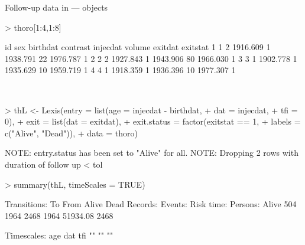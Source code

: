 \begin{frame}{Follow-up data in  ---  objects}
\begin{Schunk}
\begin{Sinput}
> thoro[1:4,1:8]
\end{Sinput}
\begin{Soutput}
  id sex birthdat contrast injecdat volume  exitdat exitstat
1  1   2 1916.609        1 1938.791     22 1976.787        1
2  2   2 1927.843        1 1943.906     80 1966.030        1
3  3   1 1902.778        1 1935.629     10 1959.719        1
4  4   1 1918.359        1 1936.396     10 1977.307        1
\end{Soutput}
\end{Schunk}
\ \\[-1em]
\begin{Schunk}
\begin{Sinput}
> thL <- Lexis(entry = list(age = injecdat - birthdat,
+                           dat = injecdat,
+                           tfi = 0),
+               exit = list(dat = exitdat),
+        exit.status = factor(exitstat == 1,
+                             labels = c("Alive", "Dead")),
+               data = thoro)
\end{Sinput}
\begin{Soutput}
NOTE: entry.status has been set to "Alive" for all.
NOTE: Dropping  2  rows with duration of follow up < tol
\end{Soutput}
\begin{Sinput}
> summary(thL, timeScales = TRUE)
\end{Sinput}
\begin{Soutput}
Transitions:
     To
From    Alive Dead Records: Events: Risk time: Persons:
  Alive   504 1964     2468    1964   51934.08     2468

Timescales:
age dat tfi 
 ""  ""  "" 
\end{Soutput}
\end{Schunk}
\end{frame}

